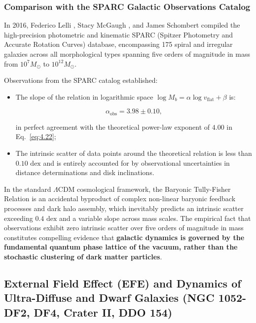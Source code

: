 \documentclass[11pt,a4paper]{article}
\theoremstyle{definition}
\begin{document}
\subsubsection{Comparison with the SPARC Galactic Observations Catalog}

In 2016, Federico Lelli \cite{ref26}, Stacy McGaugh \cite{ref27}, and James Schombert compiled the high-precision photometric and kinematic SPARC (Spitzer Photometry and Accurate Rotation Curves) database, encompassing 175 spiral and irregular galaxies across all morphological types spanning five orders of magnitude in mass from $10^7 M_\odot$ to $10^{12} M_\odot$.

Observations from the SPARC catalog established:

\begin{itemize}
\item The slope of the relation in logarithmic space $\log M_b = \alpha \log v_{\text{flat}} + \beta$ is:

\begin{equation*}
\alpha_{\text{obs}} = \mathbf{3.98 \pm 0.10},
\end{equation*}

in perfect agreement with the theoretical power-law exponent of \textbf{$4.00$} in Eq.~\eqref{eq:4.22};

\item The intrinsic scatter of data points around the theoretical relation is less than $0.10\text{ dex}$ and is entirely accounted for by observational uncertainties in distance determinations and disk inclinations.
\end{itemize}

In the standard $\Lambda\text{CDM}$ cosmological framework, the Baryonic Tully-Fisher Relation is an accidental byproduct of complex non-linear baryonic feedback processes and dark halo assembly, which inevitably predicts an intrinsic scatter exceeding $0.4\text{ dex}$ and a variable slope across mass scales. The empirical fact that observations exhibit zero intrinsic scatter over five orders of magnitude in mass constitutes compelling evidence that \textbf{galactic dynamics is governed by the fundamental quantum phase lattice of the vacuum, rather than the stochastic clustering of dark matter particles}.


\subsection{External Field Effect (EFE) and Dynamics of Ultra-Diffuse and Dwarf Galaxies (NGC 1052-DF2, DF4, Crater II, DDO 154)}\label{sec:4.3}
\end{document}
